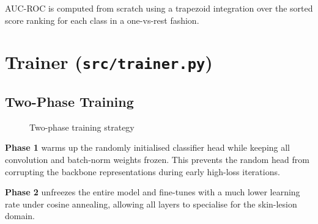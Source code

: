 \documentclass[12pt,a4paper]{report}
\begin{document}
AUC-ROC is computed from scratch using a trapezoid integration over the sorted score ranking for each class in a one-vs-rest fashion.

\section{Trainer (\texttt{src/trainer.py})}

\subsection{Two-Phase Training}

\begin{figure}[ht]
  \centering
  \caption{Two-phase training strategy}
  \label{fig:twophase}
\end{figure}

\textbf{Phase 1} warms up the randomly initialised classifier head while keeping all convolution and batch-norm weights frozen. This prevents the random head from corrupting the backbone representations during early high-loss iterations.

\textbf{Phase 2} unfreezes the entire model and fine-tunes with a much lower learning rate under cosine annealing, allowing all layers to specialise for the skin-lesion domain.
\end{document}
